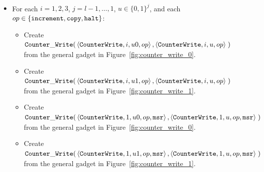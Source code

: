 \subsubsection{\cwrite}

\begin{itemize}

    \item For each $i = 1,2,3$,
                   $j = l-1,\ldots,1$,
                   $u \in \{0, 1\}^j$, and each
                   $op \in \{ {\tt increment}, {\tt copy}, {\tt halt} \}$:
        \begin{itemize}
        \item Create
        $\begin{aligned}[t]
            {\tt Counter\_Write}(& \left\langle {\tt CounterWrite}, i, u0, op \right\rangle,
                      \left\langle {\tt CounterWrite}, i, u,  op \right\rangle \;)
        \end{aligned}$ \\ from the general gadget in Figure~\ref{fig:counter_write_0}.

        \item Create
        $\begin{aligned}[t]
            {\tt Counter\_Write}(& \left\langle {\tt CounterWrite}, i,  u1, op \right\rangle,
                      \left\langle {\tt CounterWrite}, i,  u,  op \right\rangle \;)
        \end{aligned}$ \\ from the general gadget in Figure~\ref{fig:counter_write_1}.


        \item Create
        $\begin{aligned}[t]
            {\tt Counter\_Write}(& \left\langle {\tt CounterWrite}, 1, u0, op, {\tt msr} \right\rangle,
                      \left\langle {\tt CounterWrite}, 1, u,  op, {\tt msr} \right\rangle \;)
        \end{aligned}$ \\ from the general gadget in Figure~\ref{fig:counter_write_0}.

        \item Create
        $\begin{aligned}[t]
            {\tt Counter\_Write}(& \left\langle {\tt CounterWrite}, 1,  u1, op, {\tt msr} \right\rangle,
                      \left\langle {\tt CounterWrite}, 1,  u,  op, {\tt msr} \right\rangle \;)
        \end{aligned}$ \\ from the general gadget in Figure~\ref{fig:counter_write_1}.


\end{itemize}
\end{itemize}
